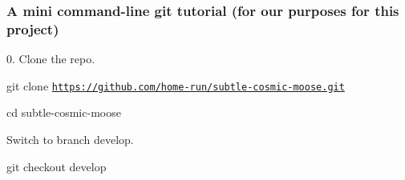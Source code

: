 \subsubsection*{A mini command-\/line git tutorial (for our purposes for this project)}

0. Clone the repo.
\begin{DoxyItemize}
\item {\ttfamily git clone \href{https://github.com/home-run/subtle-cosmic-moose.git}{\tt https\+://github.\+com/home-\/run/subtle-\/cosmic-\/moose.\+git}}
\item {\ttfamily cd subtle-\/cosmic-\/moose}
\end{DoxyItemize}

Switch to branch {\ttfamily develop}.
\begin{DoxyItemize}
\item {\ttfamily git checkout develop}
\end{DoxyItemize}

